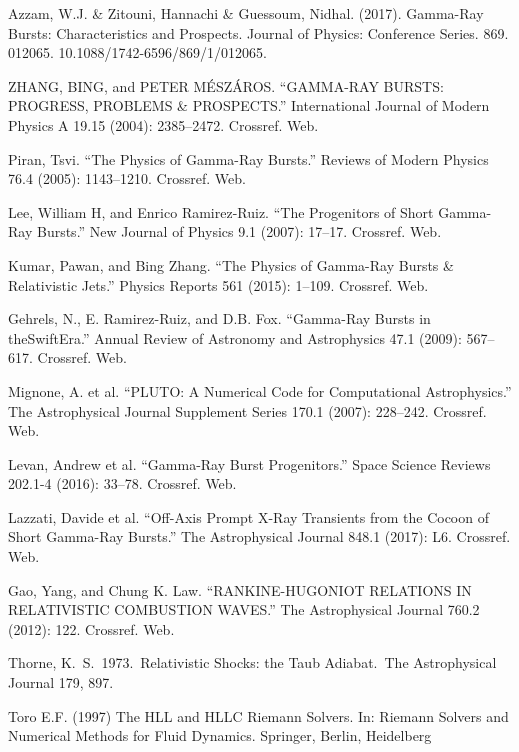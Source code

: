 \documentclass[12pt,a4paper]{book}
\begin{document}
\begin{thebibliography}{20}
Azzam, W.J. \& Zitouni, Hannachi \& Guessoum, Nidhal. (2017). Gamma-Ray Bursts: Characteristics and Prospects. Journal of Physics: Conference Series. 869. 012065. 10.1088/1742-6596/869/1/012065. 

ZHANG, BING, and PETER MÉSZÁROS. “GAMMA-RAY BURSTS: PROGRESS, PROBLEMS \& PROSPECTS.” International Journal of Modern Physics A 19.15 (2004): 2385–2472. Crossref. Web.

Piran, Tsvi. “The Physics of Gamma-Ray Bursts.” Reviews of Modern Physics 76.4 (2005): 1143–1210. Crossref. Web.

Lee, William H, and Enrico Ramirez-Ruiz. “The Progenitors of Short Gamma-Ray Bursts.” New Journal of Physics 9.1 (2007): 17–17. Crossref. Web.

Kumar, Pawan, and Bing Zhang. “The Physics of Gamma-Ray Bursts \& Relativistic Jets.” Physics Reports 561 (2015): 1–109. Crossref. Web.

Gehrels, N., E. Ramirez-Ruiz, and D.B. Fox. “Gamma-Ray Bursts in theSwiftEra.” Annual Review of Astronomy and Astrophysics 47.1 (2009): 567–617. Crossref. Web.

Mignone, A. et al. “PLUTO: A Numerical Code for Computational Astrophysics.” The Astrophysical Journal Supplement Series 170.1 (2007): 228–242. Crossref. Web.

Levan, Andrew et al. “Gamma-Ray Burst Progenitors.” Space Science Reviews 202.1-4 (2016): 33–78. Crossref. Web.

Lazzati, Davide et al. “Off-Axis Prompt X-Ray Transients from the Cocoon of Short Gamma-Ray Bursts.” The Astrophysical Journal 848.1 (2017): L6. Crossref. Web.

Gao, Yang, and Chung K. Law. “RANKINE-HUGONIOT RELATIONS IN RELATIVISTIC COMBUSTION WAVES.” The Astrophysical Journal 760.2 (2012): 122. Crossref. Web.

 Thorne, K.~S.\ 1973.\ Relativistic Shocks: the Taub Adiabat.\ The Astrophysical Journal 179, 897.

Toro E.F. (1997) The HLL and HLLC Riemann Solvers. In: Riemann Solvers and Numerical Methods for Fluid Dynamics. Springer, Berlin, Heidelberg


\end{thebibliography}
\end{document}
